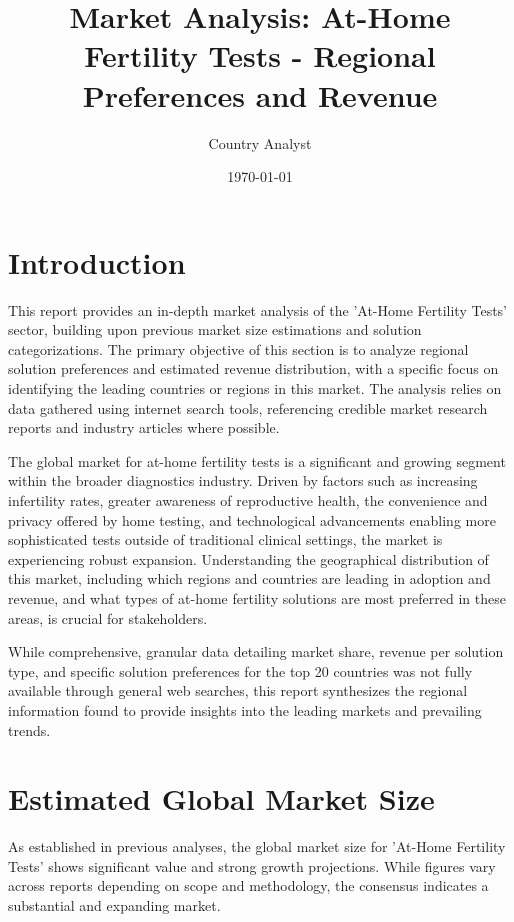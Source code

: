 \documentclass{article}
\title{Market Analysis: At-Home Fertility Tests - Regional Preferences and Revenue}
\author{Country Analyst}
\date{\today}
\begin{document}
\maketitle

\section{Introduction}
This report provides an in-depth market analysis of the 'At-Home Fertility Tests' sector, building upon previous market size estimations and solution categorizations. The primary objective of this section is to analyze regional solution preferences and estimated revenue distribution, with a specific focus on identifying the leading countries or regions in this market. The analysis relies on data gathered using internet search tools, referencing credible market research reports and industry articles where possible.

The global market for at-home fertility tests is a significant and growing segment within the broader diagnostics industry. Driven by factors such as increasing infertility rates, greater awareness of reproductive health, the convenience and privacy offered by home testing, and technological advancements enabling more sophisticated tests outside of traditional clinical settings, the market is experiencing robust expansion. Understanding the geographical distribution of this market, including which regions and countries are leading in adoption and revenue, and what types of at-home fertility solutions are most preferred in these areas, is crucial for stakeholders.

While comprehensive, granular data detailing market share, revenue per solution type, and specific solution preferences for the top 20 countries was not fully available through general web searches, this report synthesizes the regional information found to provide insights into the leading markets and prevailing trends.

\section{Estimated Global Market Size}

As established in previous analyses, the global market size for 'At-Home Fertility Tests' shows significant value and strong growth projections. While figures vary across reports depending on scope and methodology, the consensus indicates a substantial and expanding market.
\end{document}
